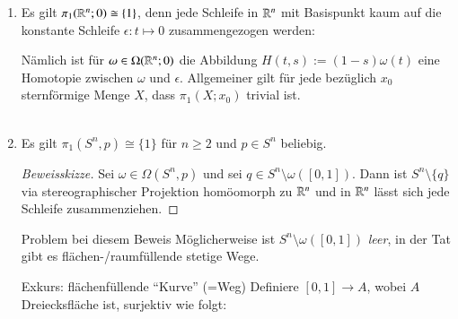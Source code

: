 \documentclass[a4paper,10pt]{scrartcl}
\newcommand{\homo}{\cong}
\begin{document}
\begin{exs*}
 \begin{enumerate}[(1)]
  \item Es gilt $\pi_1(\R^n;0)\homo \{1\}$, denn jede Schleife in $\mathbb{R}^n$ mit Basispunkt kaum auf die konstante Schleife $\epsilon: t \mapsto 0$ zusammengezogen werden:

Nämlich ist für $\omega \in \Omega(\mathbb{R}^n;0)$ die Abbildung $H(t,s):=(1-s)\omega(t)$ eine Homotopie zwischen $\omega$ und $\epsilon$. Allgemeiner gilt für jede bezüglich $x_0$ sternförmige Menge $X$, dass $\pi_1(X;x_0)$ trivial ist.\\
\fixme[fig57]\\
\item Es gilt $\pi_1(S^n, p) \homo \{1\}$ für $n\ge 2$ und $p\in S^n$ beliebig.\\
\fixme[fig58]
\begin{proof}[Beweisskizze]
\fixme[fig59]
 Sei $\omega \in \Omega(S^n,p)$ und sei $q\in S^n\setminus \omega([0,1])$. Dann ist $S^n\setminus\{q\}$ via stereographischer Projektion homöomorph zu $\mathbb{R}^n$ und in $\mathbb{R}^n$ lässt sich jede Schleife zusammenziehen.
\end{proof}
\begin{seg}{Problem bei diesem Beweis}
 Möglicherweise ist $S^n \setminus \omega([0,1])$ \emph{leer}, in der Tat gibt es flächen-/raumfüllende stetige Wege.
\end{seg}
\begin{seg}{Exkurs: flächenfüllende "`Kurve"' (=Weg)}
 Definiere $[0,1] \to A $, wobei $A$ Dreiecksfläche ist, surjektiv wie folgt:


\end{seg}
\end{enumerate}
\end{exs*}
\end{document}
